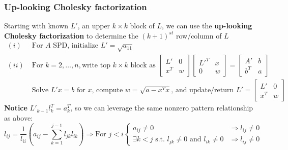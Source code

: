 \documentclass{article}
\begin{document}
\subsubsection{Up-looking Cholesky factorization}
Starting with known $L'$, an upper $k \times k$ block of $L$, we can use the \textbf{up-looking Cholesky factorization} to determine the $(k+1)^{st}$ row/column of $L$
\begin{align*}
    (i) \;& \textrm{For $A$ SPD, initialize } L' = \sqrt{a_{11}}\\
    (ii) \;& \textrm{For } k=2, \dots, n, \textrm{write top $k\times k$ block as } \begin{bmatrix} L' & 0\\x^T & w \end{bmatrix} \begin{bmatrix} L'^T & x\\0 & w \end{bmatrix} = \begin{bmatrix} A' & b\\b^T & a \end{bmatrix}\\
    &\textrm{Solve } L'x=b \textrm{ for $x$, compute } w = \sqrt{a-x^Tx} \textrm{, and update/return } L' = \begin{bmatrix} L' & 0\\x^T & w \end{bmatrix}
\end{align*}
\textbf{Notice } $L'_{k-1}l_k^T = a_k^T$, so we can leverage the same nonzero pattern relationship as above:
\begin{equation*}
    l_{ij} = \frac{1}{l_{ii}}\left(a_{ij} - \sum_{k=1}^{j-1}l_{jk}l_{ik}\right) \Longrightarrow \textrm{For } j < i
    \begin{cases}
        a_{ij} \neq 0 & \Rightarrow l_{ij} \neq 0\\
        \exists k<j \textrm{ s.t. } l_{jk} \neq 0 \textrm{ and } l_{ik} \neq 0 & \Rightarrow l_{ij} \neq 0
    \end{cases}
\end{equation*}
\end{document}
